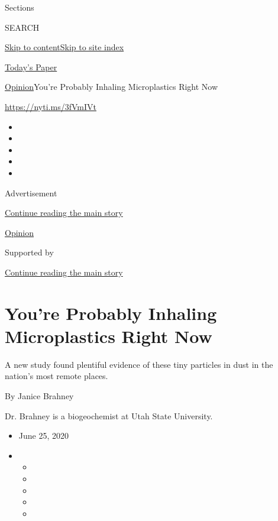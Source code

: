 Sections

SEARCH

\protect\hyperlink{site-content}{Skip to
content}\protect\hyperlink{site-index}{Skip to site index}

\href{https://myaccount.nytimes3xbfgragh.onion/auth/login?response_type=cookie\&client_id=vi}{}

\href{https://www.nytimes3xbfgragh.onion/section/todayspaper}{Today's
Paper}

\href{/section/opinion}{Opinion}\textbar{}You're Probably Inhaling
Microplastics Right Now

\url{https://nyti.ms/3fVmIVt}

\begin{itemize}
\item
\item
\item
\item
\item
\end{itemize}

Advertisement

\protect\hyperlink{after-top}{Continue reading the main story}

\href{/section/opinion}{Opinion}

Supported by

\protect\hyperlink{after-sponsor}{Continue reading the main story}

\hypertarget{youre-probably-inhaling-microplastics-right-now}{%
\section{You're Probably Inhaling Microplastics Right
Now}\label{youre-probably-inhaling-microplastics-right-now}}

A new study found plentiful evidence of these tiny particles in dust in
the nation's most remote places.

By Janice Brahney

Dr. Brahney is a biogeochemist at Utah State University.

\begin{itemize}
\item
  June 25, 2020
\item
  \begin{itemize}
  \item
  \item
  \item
  \item
  \item
  \end{itemize}
\end{itemize}

